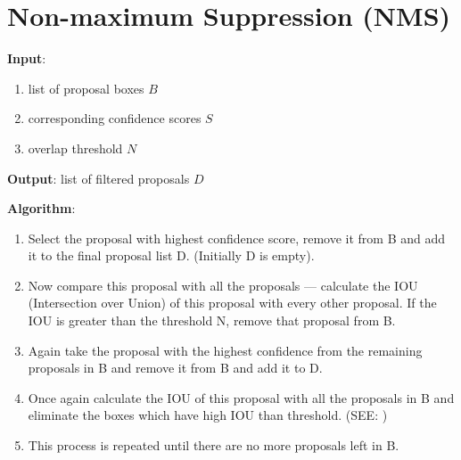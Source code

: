 \section{Non-maximum Suppression (NMS) \cite{medium/towardsdatascience.com/non-maximum-suppression-nms-93ce178e177c}}\label{Non-maximum Suppression (NMS)}

\textbf{Input}:
\begin{enumerate}
    \item list of proposal boxes $B$

    \item corresponding confidence scores $S$
    
    \item overlap threshold $N$
\end{enumerate}

\noindent \textbf{Output}: list of filtered proposals $D$

\vspace{0.2cm}
\noindent \textbf{Algorithm}:
\begin{enumerate}
    \item Select the proposal with highest confidence score, remove it from B and add it to the final proposal list D. (Initially D is empty).

    \item Now compare this proposal with all the proposals — calculate the IOU (Intersection over Union) of this proposal with every other proposal. If the IOU is greater than the threshold N, remove that proposal from B.

    \item Again take the proposal with the highest confidence from the remaining proposals in B and remove it from B and add it to D.

    \item Once again calculate the IOU of this proposal with all the proposals in B and eliminate the boxes which have high IOU than threshold. (SEE: )

    \item This process is repeated until there are no more proposals left in B.

\end{enumerate}

